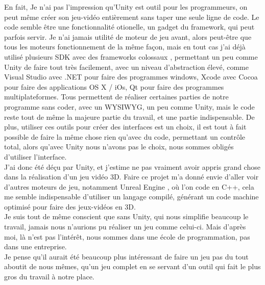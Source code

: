 \documentclass[12pt]{article}
\begin{document}
En fait, Je n'ai pas l'impression qu'Unity est outil pour les programmeurs, on peut même créer son jeu-vidéo entièrement sans taper une seule ligne de code. Le code semble être une fonctionnalité otionelle, un gadget du \gls{framework}, qui peut parfois servir. Je n'ai jamais utilité de moteur de jeu avant, alors peut-être que tous les moteurs fonctionnement de la même façon, mais en tout cas j'ai déjà utilisé plusieurs \gls{SDK} avec des \og frameworks colossaux \fg{}, permettant un peu comme Unity de faire tout très facilement, avec un niveau d'abstraction élevé, comme Visual Studio \cite{visual} avec .NET \cite{net} pour faire des programmes windows, Xcode avec \gls{Cocoa} pour faire des applications OS X / iOs, \gls{Qt} pour faire des programmes multiplateformes. Tous permettent de réaliser certaines parties de notre programme sans coder, avec un \gls{WYSIWYG}, un peu comme Unity, mais le code reste tout de même la majeure partie du travail, et une partie indispensable. De plus, utiliser ces outils pour créer des interfaces est un choix, il est tout à fait possible de faire la même chose rien qu'avec du code, permettant un contrôle total, alors qu'avec Unity nous n'avons pas le choix, nous sommes obligés d'utiliser l'interface.\\
J'ai donc été déçu par Unity, et j'estime ne pas vraiment avoir appris grand chose dans la réalisation d'un jeu vidéo 3D. Faire ce projet m'a donné envie d'aller voir d'autres moteurs de jeu, notamment Unreal Engine \cite{unreal}, où l'on code en \gls{C++}, cela me semble indispensable d'utiliser un langage compilé, générant un code machine optimisé pour faire des jeux-vidéos en 3D.\\

Je suis tout de même conscient que sans Unity, qui nous simplifie beaucoup le travail, jamais nous n'aurions pu réaliser un jeu comme celui-ci. Mais d'après moi, là n'est pas l'intérêt, nous sommes dans une école de programmation, pas dans une entreprise.\\
Je pense qu'il aurait été beaucoup plus intéressant de faire un jeu pas du tout aboutit de nous mêmes, qu'un jeu complet en se servant d'un outil qui fait le plus gros du travail à notre place.\\
\end{document}
